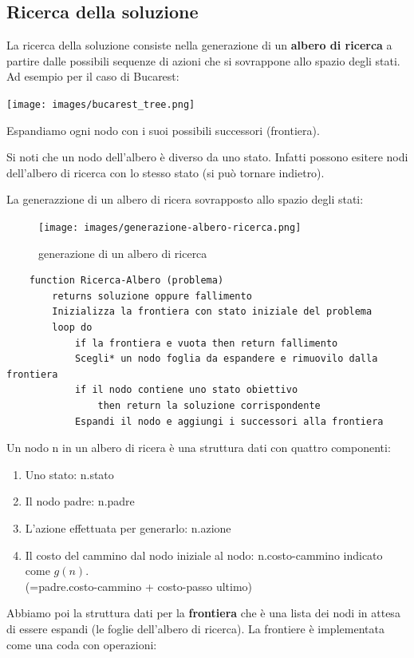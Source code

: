 \subsection{Ricerca della soluzione}
La ricerca della soluzione consiste nella generazione di un \textbf{albero di ricerca} a partire dalle possibili sequenze di azioni che si sovrappone allo spazio degli stati.\\
Ad esempio per il caso di Bucarest:
\begin{center}
	\texttt{[image: images/bucarest\_tree.png]}
\end{center}
Espandiamo ogni nodo con i suoi possibili successori (frontiera).
\begin{observation}
	Si noti che un nodo dell'albero è diverso da uno stato. Infatti possono esitere nodi dell'albero di ricerca con lo stesso stato (si può tornare indietro).
\end{observation}
\hspace{-15pt}La generazzione di un albero di ricera sovrapposto allo spazio degli stati:
\begin{figure}[h!]
	\centering
	\texttt{[image: images/generazione-albero-ricerca.png]}
	\caption{generazione di un albero di ricerca}
\end{figure}
\begin{lstlisting}
	function Ricerca-Albero (problema)
		returns soluzione oppure fallimento
		Inizializza la frontiera con stato iniziale del problema
		loop do
			if la frontiera e vuota then return fallimento
			Scegli* un nodo foglia da espandere e rimuovilo dalla frontiera
			if il nodo contiene uno stato obiettivo
				then return la soluzione corrispondente
			Espandi il nodo e aggiungi i successori alla frontiera 
\end{lstlisting}
Un nodo n in un albero di ricera è una struttura dati con quattro componenti:
\begin{enumerate}
	\item Uno stato: n.stato
	\item Il nodo padre: n.padre
	\item L'azione effettuata per generarlo: n.azione
	\item Il costo del cammino dal nodo iniziale al nodo: n.costo-cammino indicato come $g(n)$.\\
	(=padre.costo-cammino + costo-passo ultimo)
\end{enumerate}
Abbiamo poi la struttura dati per la \textbf{frontiera} che è una lista dei nodi in attesa di essere
espandi (le foglie dell'albero di ricerca). La frontiere è implementata come una coda con operazioni:
